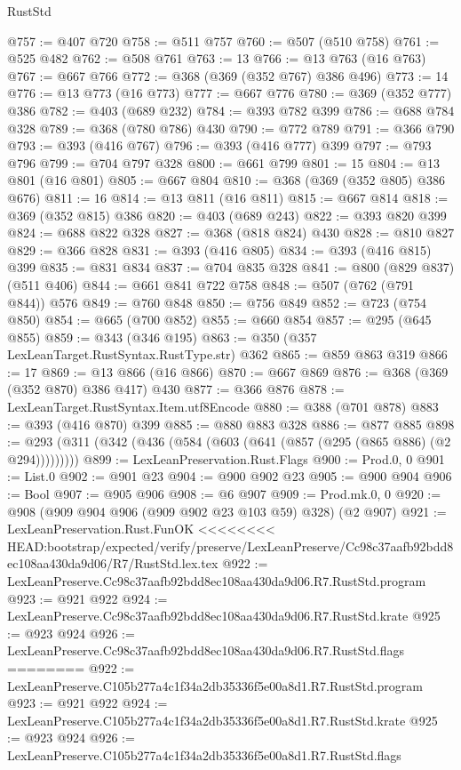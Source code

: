 \begin{lexlean}{RustStd}
\begin{coremodule}
{\begin{coremodule}
{{{{{{{{{{@757 := @407 @720
@758 := @511 @757
@760 := @507 (@510 @758)
@761 := @525 @482
@762 := @508 @761
@763 := 13
@766 := @13 @763 (@16 @763)
@767 := @667 @766
@772 := @368 (@369 (@352 @767) @386 @496)
@773 := 14
@776 := @13 @773 (@16 @773)
@777 := @667 @776
@780 := @369 (@352 @777) @386
@782 := @403 (@689 @232)
@784 := @393 @782 @399
@786 := @688 @784 @328
@789 := @368 (@780 @786) @430
@790 := @772 @789
@791 := @366 @790
@793 := @393 (@416 @767)
@796 := @393 (@416 @777) @399
@797 := @793 @796
@799 := @704 @797 @328
@800 := @661 @799
@801 := 15
@804 := @13 @801 (@16 @801)
@805 := @667 @804
@810 := @368 (@369 (@352 @805) @386 @676)
@811 := 16
@814 := @13 @811 (@16 @811)
@815 := @667 @814
@818 := @369 (@352 @815) @386
@820 := @403 (@689 @243)
@822 := @393 @820 @399
@824 := @688 @822 @328
@827 := @368 (@818 @824) @430
@828 := @810 @827
@829 := @366 @828
@831 := @393 (@416 @805)
@834 := @393 (@416 @815) @399
@835 := @831 @834
@837 := @704 @835 @328
@841 := @800 (@829 @837) (@511 @406)
@844 := @661 @841 @722 @758
@848 := @507 (@762 (@791 @844)) @576
@849 := @760 @848
@850 := @756 @849
@852 := @723 (@754 @850)
@854 := @665 (@700 @852)
@855 := @660 @854
@857 := @295 (@645 @855)
@859 := @343 (@346 @195)
@863 := @350 (@357 LexLeanTarget.RustSyntax.RustType.str) @362
@865 := @859 @863 @319
@866 := 17
@869 := @13 @866 (@16 @866)
@870 := @667 @869
@876 := @368 (@369 (@352 @870) @386 @417) @430
@877 := @366 @876
@878 := LexLeanTarget.RustSyntax.Item.utf8Encode
@880 := @388 (@701 @878)
@883 := @393 (@416 @870) @399
@885 := @880 @883 @328
@886 := @877 @885
@898 := @293 (@311 (@342 (@436 (@584 (@603 (@641 (@857 (@295 (@865 @886) (@2 @294)))))))))
@899 := LexLeanPreservation.Rust.Flags
@900 := Prod.{0, 0}
@901 := List.{0}
@902 := @901 @23
@904 := @900 @902 @23
@905 := @900 @904
@906 := Bool
@907 := @905 @906
@908 := @6 @907
@909 := Prod.mk.{0, 0}
@920 := @908 (@909 @904 @906 (@909 @902 @23 @103 @59) @328) (@2 @907)
@921 := LexLeanPreservation.Rust.FunOK
<<<<<<<< HEAD:bootstrap/expected/verify/preserve/LexLeanPreserve/Cc98c37aafb92bdd8ec108aa430da9d06/R7/RustStd.lex.tex
@922 := LexLeanPreserve.Cc98c37aafb92bdd8ec108aa430da9d06.R7.RustStd.program
@923 := @921 @922
@924 := LexLeanPreserve.Cc98c37aafb92bdd8ec108aa430da9d06.R7.RustStd.krate
@925 := @923 @924
@926 := LexLeanPreserve.Cc98c37aafb92bdd8ec108aa430da9d06.R7.RustStd.flags
========
@922 := LexLeanPreserve.C105b277a4c1f34a2db35336f5e00a8d1.R7.RustStd.program
@923 := @921 @922
@924 := LexLeanPreserve.C105b277a4c1f34a2db35336f5e00a8d1.R7.RustStd.krate
@925 := @923 @924
@926 := LexLeanPreserve.C105b277a4c1f34a2db35336f5e00a8d1.R7.RustStd.flags
}}}}}}}}}}
\end{coremodule}}
\end{coremodule}
\end{lexlean}
